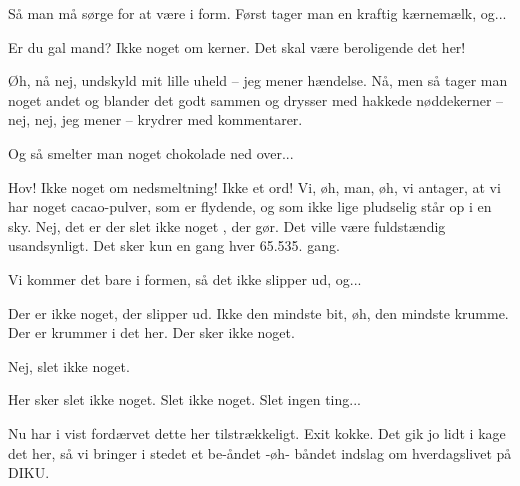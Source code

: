 \documentclass[a4paper,11pt]{article}
\begin{document}
\begin{sketch}
 Så man må sørge for at være i form.  Først tager man en kraftig
kærnemælk, og...

 Er du gal mand?  Ikke noget om kerner. Det skal være beroligende det
her!

 Øh, nå nej, undskyld mit lille uheld -- jeg mener hændelse. Nå, men så
tager man noget andet og blander det godt sammen og drysser med hakkede
nøddekerner -- nej, nej, jeg mener -- krydrer med kommentarer.

 Og så smelter man noget chokolade ned over...

 Hov! Ikke noget om nedsmeltning! Ikke et ord! Vi, øh, man, øh, vi
antager, at vi har noget cacao-pulver, som er flydende, og som ikke lige
pludselig står op i en sky. Nej, det er der slet ikke noget , der gør. Det ville
være fuldstændig usandsynligt. Det sker kun en gang hver 65.535. gang.

 Vi kommer det bare i formen, så det ikke slipper ud, og...

 Der er ikke noget, der slipper ud. Ikke den mindste bit, øh, den
mindste krumme. Der er krummer i det her. Der sker ikke noget.

 Nej, slet ikke noget.

 Her sker slet ikke noget. Slet ikke noget. Slet ingen ting...

 Nu har i vist fordærvet dette her tilstrækkeligt. Exit
kokke.  Det gik jo lidt i kage
det her, så vi bringer i stedet et be-åndet -øh- båndet indslag om hverdagslivet
på DIKU.

\end{sketch}
\end{document}
